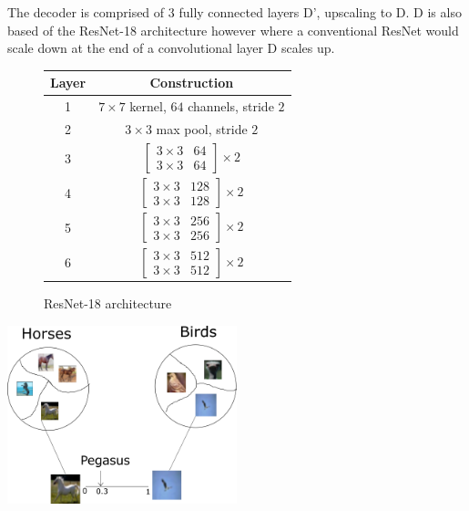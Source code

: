 \documentclass{article}
\begin{document}
The decoder is comprised of 3 fully connected layers D', upscaling to D. D is also based of the ResNet-18 architecture however where a conventional ResNet would scale down at the end of a convolutional layer D scales up.


\begin{figure}
    \begin{center}
\begin{tabular}{c|c}
    Layer&Construction\\
    \hline
    1 & $7\times7$ kernel, $64$ channels, stride $2$\\
    2 & $3\times3$ max pool, stride $2$\\
    3 & $\begin{bmatrix} 3 \times 3 & 64 \\ 3 \times 3 & 64 \end{bmatrix} \times 2$\\
    4 & $\begin{bmatrix} 3 \times 3 & 128 \\ 3 \times 3 & 128 \end{bmatrix} \times 2$\\
    5 & $\begin{bmatrix} 3 \times 3 & 256 \\ 3 \times 3 & 256 \end{bmatrix} \times 2$\\
    6 & $\begin{bmatrix} 3 \times 3 & 512 \\ 3 \times 3 & 512 \end{bmatrix} \times 2$\\
\end{tabular}
\end{center}
\caption{ResNet-18 architecture}
\label{tab:res18}
\end{figure}


\begin{center}
    \includegraphics[width=0.5\textwidth]{figures/clustering.png}
\end{center}
\end{document}
